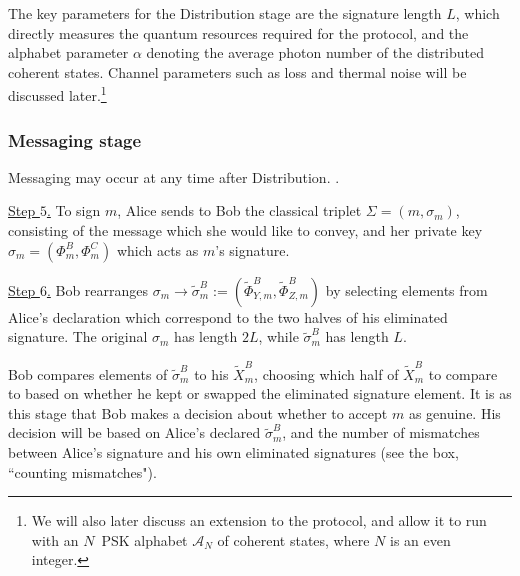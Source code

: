 The key parameters for the Distribution stage are the signature length $L$, which directly measures the quantum resources required for the protocol, and the alphabet parameter $\alpha$ denoting the average photon number of the distributed coherent states. Channel parameters such as loss and thermal noise will be discussed later.\footnote{We will also later discuss an extension to the protocol, and allow it to run with an $N$~PSK alphabet $\mathcal{A}_N$ of coherent states, where $N$ is an even integer.}

\subsubsection{Messaging stage}

Messaging may occur at any time after Distribution. .

\noindent \underline{Step $5$.} To sign $m$, Alice sends to Bob the classical triplet $\Sigma = \left(m, \sigma_m\right)$, consisting of the message which she would like to convey, and her private key $\sigma_m = \left(\Phi_m^B, \Phi_m^C\right)$ which acts as $m$'s signature. 

\noindent \underline{Step $6$.} Bob rearranges $\sigma_m \rightarrow \tilde{\sigma}_m^B := \left(\tilde{\Phi}_{Y, m}^B, \tilde{\Phi}_{Z, m}^B\right)$ by selecting elements from Alice's declaration which correspond to the two halves of his eliminated signature. The original $\sigma_m$ has length $2 L$, while $\tilde{\sigma}_m^B$ has length $L$.

Bob compares elements of $\tilde{\sigma}_m^B$ to his $\tilde{X}_m^{B}$, choosing which half of $\tilde{X}_m^B$ to compare to based on whether he kept or swapped the eliminated signature element. It is as this stage that Bob makes a decision about whether to accept $m$ as genuine. His decision will be based on Alice's declared $\tilde{\sigma}_m^B$, and the number of mismatches between Alice's signature and his own eliminated signatures (see the box, ``counting mismatches").

